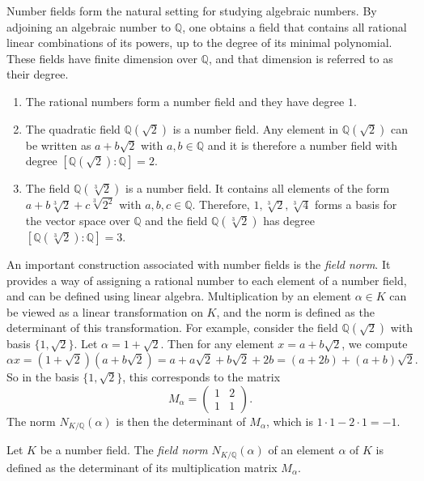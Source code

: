 Number fields form the natural setting for studying algebraic numbers.
By adjoining an algebraic number to $ℚ$, one obtains a field that contains all
rational linear combinations of its powers, up to the degree of its minimal polynomial.
These fields have finite dimension over $ℚ$, and that dimension is referred to as their degree.

\begin{example}
  \hfill
  \begin{enumerate}
    \item The rational numbers form a number field and they have degree $1$.
    \item The quadratic field $ℚ(\sqrt{2})$ is a number field.
      Any element in $ ℚ(\sqrt{2})$ can be written as $a + b \sqrt{2}$ with $a,b ∈ ℚ$
      and it is therefore a number field with degree $[ℚ(\sqrt{2}) : ℚ] = 2$.
    \item The field $ℚ(\sqrt[3]{2})$ is a number field.
      It contains all elements of the form $a + b \sqrt[3]{2} + c \sqrt[3]{2^2}$ with $a,b,c ∈ ℚ$.
      Therefore, $1, \sqrt[3]{{2}}, \sqrt[3]{4}$ forms a basis for the vector space over $ℚ$
      and the field $ℚ(\sqrt[3]{2})$ has degree $[ℚ(\sqrt[3]{2}) : ℚ] = 3$.
  \end{enumerate}
\end{example}

An important construction associated with number fields is the \emph{field norm}.
It provides a way of assigning a rational number to each element of a number field,
and can be defined using linear algebra.
Multiplication by an element $α ∈ K$ can be viewed as a linear transformation on $K$,
and the norm is defined as the determinant of this transformation.
For example, consider the field $ℚ(\sqrt{2})$ with basis $\{1, \sqrt{2}\}$.
Let $α = 1 + \sqrt{2}$.
Then for any element $x = a + b \sqrt{2}$, we compute
\[
  αx = (1 + \sqrt{2})(a + b \sqrt{2}) = a + a \sqrt{2} + b \sqrt{2} + 2b = (a + 2b) + (a + b)\sqrt{2}.
\]
So in the basis $\{1, \sqrt{2}\}$, this corresponds to the matrix
\[
  M_α =
  \begin{pmatrix}
    1 & 2 \\
    1 & 1
  \end{pmatrix}.
\]
The norm $N_{K/ℚ}(α)$ is then the determinant of $M_α$, which is $1 \cdot 1 - 2 \cdot 1 = -1$.

\begin{definition}
  Let $K$ be a number field.
  The \emph{field norm} $N_{K/ℚ}(α)$ of an element $α$ of $K$ is defined as the
  determinant of its multiplication matrix $M_α$.
\end{definition}

